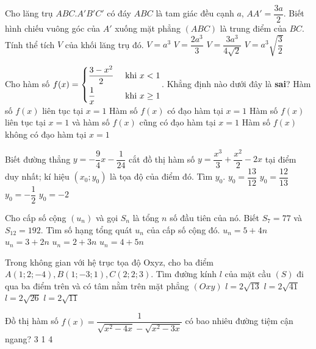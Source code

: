 \begin{ex}%
Cho lăng trụ $ABC.A'B'C'$ có đáy $ ABC $ là tam giác đều cạnh $a$, $AA'=\dfrac{3a}{2}$. Biết hình chiếu vuông góc của $A'$ xuống mặt phẳng $(ABC)$ là trung điểm của $ BC $. Tính thể tích $ V $ của khối lăng trụ đó. 
\choice
{$ V=a^3 $}
{$ V=\dfrac{2a^3}{3}$}
{\True $ V=\dfrac{3a^3}{4\sqrt{2}}$}
{$ V=a^3\sqrt{\dfrac{3}{2}}$}
\end{ex}

\begin{ex}%
Cho hàm số $ f(x)=\left\{\begin{aligned}&\dfrac{3-x^2}{2} &\text{ khi } x<1 \\  &\dfrac{1}{x}&\text{ khi } x\ge 1\end{aligned}\right.$. Khẳng định nào dưới đây là \textbf{sai}? 
\choice
{Hàm số $ f(x)$ liên tục tại $ x=1 $}
{Hàm số $ f(x)$ có đạo hàm tại $ x=1 $}
{Hàm số $ f(x)$ liên tục tại $ x=1 $ và hàm số $ f(x)$ cũng có đạo hàm tại $ x=1 $}
{\True Hàm số $ f(x)$ không có đạo hàm tại $ x=1 $}

\end{ex}

\begin{ex}%
Biết đường thẳng $ y=-\dfrac{9}{4}x-\dfrac{1}{24}$ cắt đồ thị hàm số $ y=\dfrac{x^3}{3}+\dfrac{x^2}{2}-2x $ tại điểm duy nhất; kí hiệu $(x_0; y_0)$ là tọa độ của điểm đó. Tìm $ y_0 $.
\choice
{\True $ y_0=\dfrac{13}{12}$}
{$ y_0=\dfrac{12}{13}$}
{$ y_0=-\dfrac{1}{2}$}
{$ y_0=-2 $}
\end{ex}

\begin{ex}%
Cho cấp số cộng $(u_n)$ và gọi $ S_n $ là tổng $ n $ số đầu tiên của nó. Biết $ S_7=77 $ và $ S_{12}=192 $. Tìm số hạng tổng quát $ u_n $ của cấp số cộng đó. 
\choice
{$ u_n=5+4n $}
{\True $ u_n=3+2n $}
{$ u_n=2+3n $}
{$ u_n=4+5n $}

\end{ex}

\begin{ex}%
Trong không gian với hệ trục tọa độ Oxyz, cho ba điểm $ A(1; 2; -4), B(1; -3; 1), C(2; 2; 3)$. Tìm đường kính $ l $ của mặt cầu $(S)$ đi qua ba điểm trên và có tâm nằm trên mặt phẳng $(Oxy)$
\choice
{$ l=2\sqrt{13}$}
{$ l=2\sqrt{41}$}
{\True $ l=2\sqrt{26}$}
{$ l=2\sqrt{11}$}
\end{ex}

\begin{ex}%
Đồ thị hàm số $ f(x)=\dfrac{1}{\sqrt{x^2-4x}-\sqrt{x^2-3x}}$ có bao nhiêu đường tiệm cận ngang? 
\choice
{3}
{1}
{4}
{}
\end{ex}

